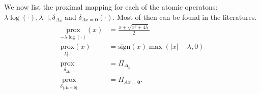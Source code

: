 \documentclass[11pt]{article}
\theoremstyle{definition}
\numberwithin{equation}{subsection}
\begin{document}
    We now list the proximal mapping for each of the atomic operatons: $\lambda\log(\cdot), \lambda|\cdot|, \delta_{\Delta_n}$ and $\delta_{Ax = \mathbf 0}(\cdot)$. 
    Most of then can be found in the literatures.     
    \begin{align*}
        \underset{-\lambda \log(\cdot)}{\text{prox}}(x)
        &= 
        \frac{x + \sqrt{x^2 + 4\lambda}}{2}
        \\
        \underset{\lambda |\cdot|}{\text{prox}}(x)
        &= 
        \text{sign}(x) \max(|x| - \lambda, 0)
        \\
        \underset{\delta_{\Delta_n}}{\text{prox}}&= 
        \Pi_{\Delta_{n}}
        \\
        \underset{\delta_{\{Ax = \mathbf 0\}}}{\text{prox}} &= 
        \Pi_{Ax = \mathbf 0}. 
    \end{align*}
\end{document}
